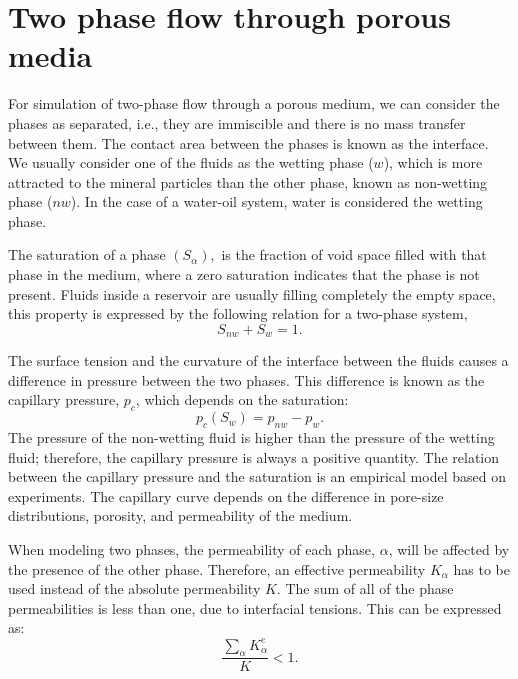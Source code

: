 \documentclass[12pt]{article}
\begin{document}
 \section{Two phase flow through porous media}\label{fpm}
\hspace{0.5cm} For simulation of two-phase flow through a porous medium, we can consider the phases as separated, i.e., 
they are immiscible and there is no mass transfer between them. The contact area between the phases is known as the interface. 
We 
usually consider one of the fluids as the wetting phase ($w$), which is more attracted to the mineral particles than the other 
phase, known as non-wetting phase ($nw$). In the case of a water-oil system, water is considered
the wetting phase. \par

The saturation of a phase $(S_{\alpha}),$ is the fraction of void space filled with that phase in the 
medium, where a zero saturation indicates that the phase is not present.
Fluids inside a reservoir are usually filling completely the empty space, this property is expressed by the following relation 
for a two-phase system,
\begin{equation}\label{eq:satrel}
 S_{nw}+S_w=1.
\end{equation}\par
The surface tension and the curvature of the interface between the fluids causes a difference in pressure
between the two phases. 
This difference is known as the capillary pressure, $p_c$, which depends on the saturation:
\begin{equation}\label{eq:cappress}
 p_c(S_w)=p_{nw}-p_w.
\end{equation}
The pressure of the non-wetting fluid is higher than the pressure of the wetting fluid; therefore, 
the capillary pressure is always a positive quantity. 
The relation between the capillary pressure and the saturation is an empirical model based on experiments. 
The capillary curve depends on the difference in pore-size 
distributions, porosity, and permeability of the medium.\par
When modeling two phases, the permeability of each phase, $\alpha$, will be affected by the presence of the other phase. 
Therefore, an effective permeability $K_\alpha$ has to be used instead of the absolute permeability $K$.  
The sum of all of the phase permeabilities is less than one, due to interfacial tensions. This can be expressed as:
$$\frac{\sum_{\alpha}K_{\alpha}^e}{K}<1.$$
\end{document}
